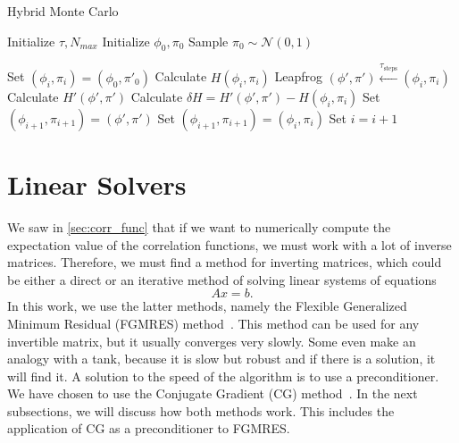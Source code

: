 \begin{algorithm}
    \caption{Hybrid Monte Carlo}
    \begin{algorithmic}[1]
        \State Initialize  $\tau, N_{max}$
        \State Initialize $\phi_0, \pi_0$
        \State Sample $\pi_0 \sim \mathcal{N}(0,1)$

        \State Set $(\phi_{i}, \pi_{i}) = (\phi_0, \pi'_0)$ 
          
            \State Calculate $H(\phi_{i}, \pi_{i})$
            \State Leapfrog $(\phi', \pi') \xleftarrow{\tau_\text{steps}} (\phi_{i}, \pi_{i})$ 
            \State Calculate $H'(\phi',\pi')$
            \State Calculate $\delta H = H'(\phi',\pi')-H(\phi_{i},\pi_{i})$
             
                \State Set $(\phi_{i+1}, \pi_{i+1}) = (\phi', \pi')$
                \Else
                \State Set $(\phi_{i+1}, \pi_{i+1}) = (\phi_{i}, \pi_{i})$
            \EndIf
        \State Set $i = i + 1$
        \EndWhile
    \end{algorithmic}
    \label{alg:hmc}
    \end{algorithm}

\section{Linear Solvers}

We saw in \cref{sec:corr_func} that if we want to numerically compute the expectation value of the correlation functions, we must work with a lot of inverse matrices. Therefore, we must find a method for inverting matrices, which could be either a direct or an iterative method of solving linear systems of equations
\begin{equation}
    Ax = b.
    \label{eq:lineq}
\end{equation}
In this work, we use the latter methods, namely the Flexible Generalized Minimum Residual (FGMRES) method~\cite{fgmresart}. This method can be used for any invertible matrix, but it usually converges very slowly. Some even make an analogy with a tank, because it is slow but robust and if there is a solution, it will find it. A solution to the speed of the algorithm is to use a preconditioner. We have chosen to use the Conjugate Gradient (CG) method~\cite{cgbook}. In the next subsections, we will discuss how both methods work. This includes the application of CG as a preconditioner to FGMRES.

